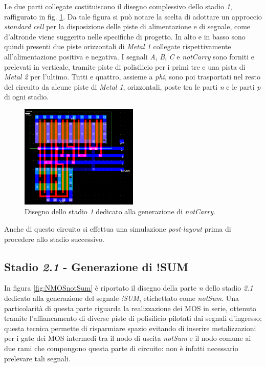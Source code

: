 Le due parti collegate costituiscono il disegno complessivo dello stadio \textit{1}, raffigurato in fig. \ref{fig:notCarry}. Da tale figura si può notare la scelta di adottare un approccio \textit{standard cell} per la disposizione delle piste di alimentazione e di segnale, come d'altronde viene suggerito nelle specifiche di progetto. In alto e in basso sono quindi presenti due piste orizzontali di \textit{Metal 1} collegate rispettivamente all'alimentazione positiva e negativa. I segnali \textit{A}, \textit{B}, \textit{C} e \textit{notCarry} sono forniti e prelevati in verticale, tramite piste di polisilicio per i primi tre e una pista di \textit{Metal 2} per l'ultimo. Tutti e quattro, assieme a \textit{phi}, sono poi trasportati nel resto del circuito da alcune piste di \textit{Metal 1}, orizzontali, poste tra le parti \textit{n} e le parti \textit{p} di ogni stadio.

\begin{figure}[hbt!]
	\centering
	\includegraphics[width=0.5\textwidth]{figure/Msk_NotCarry_V2.png}
	\caption{Disegno dello stadio \textit{1} dedicato alla generazione di \textit{notCarry}.}
	\label{fig:notCarry}
\end{figure} 

Anche di questo circuito si effettua una simulazione \textit{post-layout} prima di procedere allo stadio successivo.

\subsection{Stadio \textit{2.1} - Generazione di !SUM}

In figura \ref{fig:NMOSnotSum} è riportato il disegno della parte \textit{n} dello stadio \textit{2.1} dedicato alla generazione del segnale \textit{!SUM}, etichettato come \textit{notSum}. Una particolarità di questa parte riguarda la realizzazione dei MOS in serie, ottenuta tramite l'affiancamento di diverse piste di polisilicio pilotati dai segnali d'ingresso; questa tecnica permette di risparmiare spazio evitando di inserire metalizzazioni per i gate dei MOS intermedi tra il nodo di uscita \textit{notSum} e il nodo comune ai due rami che compongono questa parte di circuito: non è infatti necessario prelevare tali segnali.

